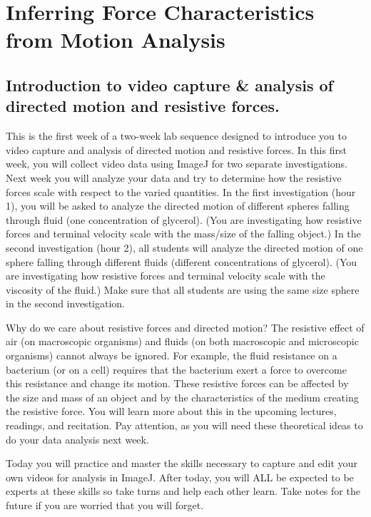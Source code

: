 \chapter{Inferring Force Characteristics from Motion Analysis}
\thispagestyle{fancy}
%
\section{Introduction to video capture \& analysis of directed motion and resistive forces.}
This is the first week of a two-week lab sequence designed to introduce you to video capture and analysis of directed motion and resistive forces.
In this first week, you will collect video data using ImageJ for two separate investigations.
Next week you will analyze your data and try to determine how the resistive forces scale with respect to the varied quantities.
In the first investigation (hour 1), you will be asked to analyze the directed motion of different spheres falling through fluid (one concentration of glycerol).
(You are investigating how resistive forces and terminal velocity scale with the mass/size of the falling object.)
In the second investigation (hour 2), all students will analyze the directed motion of one sphere falling through different fluids (different concentrations of glycerol).
(You are investigating how resistive forces and terminal velocity scale with the viscosity of the fluid.)
Make sure that all students are using the same size sphere in the second investigation.
\par
Why do we care about resistive forces and directed motion?
The resistive effect of air (on macroscopic organisms) and fluids (on both macroscopic and microscopic organisms) cannot always be ignored.
For example, the fluid resistance on a bacterium (or on a cell) requires that the bacterium exert a force to overcome this resistance and change its motion.
These resistive forces can be affected by the size and mass of an object and by the characteristics of the medium creating the resistive force.
You will learn more about this in the upcoming lectures, readings, and recitation. Pay attention, as you will need these theoretical ideas to do your data analysis next week. 
\par 
Today you will practice and master the skills necessary to capture and edit your own videos for analysis in ImageJ. 
After today, you will ALL be expected to be experts at these skills so take turns and help each other learn.
Take notes for the future if you are worried that you will forget.

